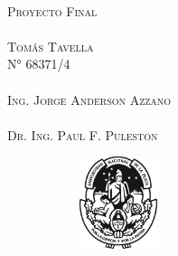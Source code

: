     \begin{titlepage}
        \begin{center}
            \vspace*{0.5cm}
            \Huge\scshape
            \color{white}
            \normalfont
            \\
            \vspace{0.5cm}
            \huge\Medium
            Proyecto Final                                       %
            \\
            \vspace{2cm}
            \Large\scshape
            \normalfont
            \\
            \large\Medium
            \vspace{0.1cm}
            Tomás Tavella
            \\
            N° 68371/4
            \\
            \vspace{1cm}
            \Large\scshape
            \normalfont
            \\
            \vspace{0.1cm}
            \large\Medium
            Ing. Jorge Anderson Azzano
            \\
            \vspace{0.4cm}
            \Large\scshape
            \normalfont
            \\
            \vspace{0.1cm}
            \large\Medium
            Dr. Ing. Paul F. Puleston
            \\
            \vfill
            \begin{figure}[H]
                \centering
                \begin{subfigure}
                    \centering
                    \includegraphics[width=0.25\textwidth]{Imagenes/UNLP.pdf}

\end{subfigure}
\end{figure}
\end{center}
\end{titlepage}
